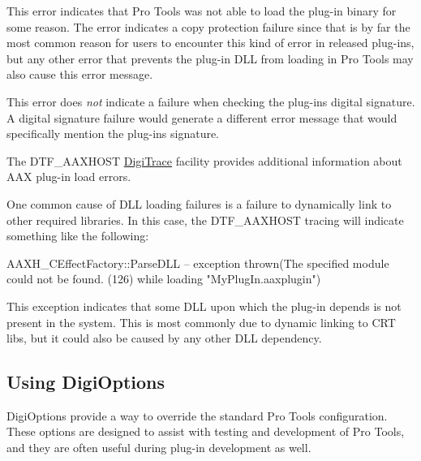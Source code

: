 \begin{DoxyItemize}
\item This error indicates that Pro Tools was not able to load the plug-\/in binary for some reason. The error indicates a copy protection failure since that is by far the most common reason for users to encounter this kind of error in released plug-\/ins, but any other error that prevents the plug-\/in D\+L\+L from loading in Pro Tools may also cause this error message.

This error does {\itshape not} indicate a failure when checking the plug-\/in\textquotesingle{}s digital signature. A digital signature failure would generate a different error message that would specifically mention the plug-\/in\textquotesingle{}s signature.

The {\ttfamily D\+T\+F\+\_\+\+A\+A\+X\+H\+O\+S\+T} \hyperlink{a00364}{Digi\+Trace} facility provides additional information about A\+A\+X plug-\/in load errors.

One common cause of D\+L\+L loading failures is a failure to dynamically link to other required libraries. In this case, the {\ttfamily D\+T\+F\+\_\+\+A\+A\+X\+H\+O\+S\+T} tracing will indicate something like the following\+: 
\begin{DoxyItemize}
\item \begin{DoxyVerb}AAXH_CEffectFactory::ParseDLL – exception thrown(The specified module could not be found. (126) while loading "MyPlugIn.aaxplugin")
\end{DoxyVerb}
  
\end{DoxyItemize}

This exception indicates that some D\+L\+L upon which the plug-\/in depends is not present in the system. This is most commonly due to dynamic linking to C\+R\+T libs, but it could also be caused by any other D\+L\+L dependency.  
\end{DoxyItemize}



 \hypertarget{a00360_aax_pro_tools_guide_06c_digioptions}{}\subsection{Using Digi\+Options}\label{a00360_aax_pro_tools_guide_06c_digioptions}
Digi\+Options provide a way to override the standard Pro Tools configuration. These options are designed to assist with testing and development of Pro Tools, and they are often useful during plug-\/in development as well.


